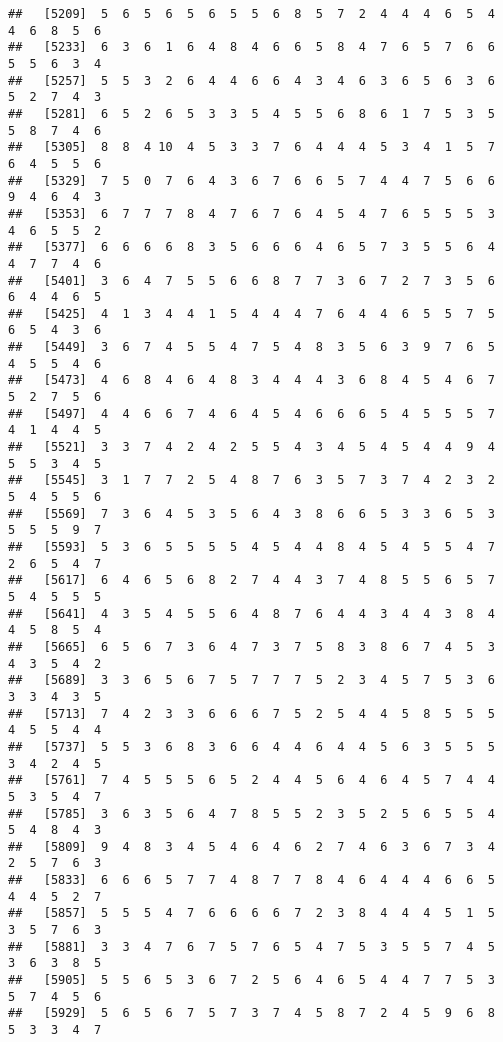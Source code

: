 \documentclass[
]{book}
\begin{document}
\begin{verbatim}
##   [5209]  5  6  5  6  5  6  5  5  6  8  5  7  2  4  4  4  6  5  4  4  6  8  5  6
##   [5233]  6  3  6  1  6  4  8  4  6  6  5  8  4  7  6  5  7  6  6  5  5  6  3  4
##   [5257]  5  5  3  2  6  4  4  6  6  4  3  4  6  3  6  5  6  3  6  5  2  7  4  3
##   [5281]  6  5  2  6  5  3  3  5  4  5  5  6  8  6  1  7  5  3  5  5  8  7  4  6
##   [5305]  8  8  4 10  4  5  3  3  7  6  4  4  4  5  3  4  1  5  7  6  4  5  5  6
##   [5329]  7  5  0  7  6  4  3  6  7  6  6  5  7  4  4  7  5  6  6  9  4  6  4  3
##   [5353]  6  7  7  7  8  4  7  6  7  6  4  5  4  7  6  5  5  5  3  4  6  5  5  2
##   [5377]  6  6  6  6  8  3  5  6  6  6  4  6  5  7  3  5  5  6  4  4  7  7  4  6
##   [5401]  3  6  4  7  5  5  6  6  8  7  7  3  6  7  2  7  3  5  6  6  4  4  6  5
##   [5425]  4  1  3  4  4  1  5  4  4  4  7  6  4  4  6  5  5  7  5  6  5  4  3  6
##   [5449]  3  6  7  4  5  5  4  7  5  4  8  3  5  6  3  9  7  6  5  4  5  5  4  6
##   [5473]  4  6  8  4  6  4  8  3  4  4  4  3  6  8  4  5  4  6  7  5  2  7  5  6
##   [5497]  4  4  6  6  7  4  6  4  5  4  6  6  6  5  4  5  5  5  7  4  1  4  4  5
##   [5521]  3  3  7  4  2  4  2  5  5  4  3  4  5  4  5  4  4  9  4  5  5  3  4  5
##   [5545]  3  1  7  7  2  5  4  8  7  6  3  5  7  3  7  4  2  3  2  5  4  5  5  6
##   [5569]  7  3  6  4  5  3  5  6  4  3  8  6  6  5  3  3  6  5  3  5  5  5  9  7
##   [5593]  5  3  6  5  5  5  5  4  5  4  4  8  4  5  4  5  5  4  7  2  6  5  4  7
##   [5617]  6  4  6  5  6  8  2  7  4  4  3  7  4  8  5  5  6  5  7  5  4  5  5  5
##   [5641]  4  3  5  4  5  5  6  4  8  7  6  4  4  3  4  4  3  8  4  4  5  8  5  4
##   [5665]  6  5  6  7  3  6  4  7  3  7  5  8  3  8  6  7  4  5  3  4  3  5  4  2
##   [5689]  3  3  6  5  6  7  5  7  7  7  5  2  3  4  5  7  5  3  6  3  3  4  3  5
##   [5713]  7  4  2  3  3  6  6  6  7  5  2  5  4  4  5  8  5  5  5  4  5  5  4  4
##   [5737]  5  5  3  6  8  3  6  6  4  4  6  4  4  5  6  3  5  5  5  3  4  2  4  5
##   [5761]  7  4  5  5  5  6  5  2  4  4  5  6  4  6  4  5  7  4  4  5  3  5  4  7
##   [5785]  3  6  3  5  6  4  7  8  5  5  2  3  5  2  5  6  5  5  4  5  4  8  4  3
##   [5809]  9  4  8  3  4  5  4  6  4  6  2  7  4  6  3  6  7  3  4  2  5  7  6  3
##   [5833]  6  6  6  5  7  7  4  8  7  7  8  4  6  4  4  4  6  6  5  4  4  5  2  7
##   [5857]  5  5  5  4  7  6  6  6  6  7  2  3  8  4  4  4  5  1  5  3  5  7  6  3
##   [5881]  3  3  4  7  6  7  5  7  6  5  4  7  5  3  5  5  7  4  5  3  6  3  8  5
##   [5905]  5  5  6  5  3  6  7  2  5  6  4  6  5  4  4  7  7  5  3  5  7  4  5  6
##   [5929]  5  6  5  6  7  5  7  3  7  4  5  8  7  2  4  5  9  6  8  5  3  3  4  7

\end{verbatim}
\end{document}

